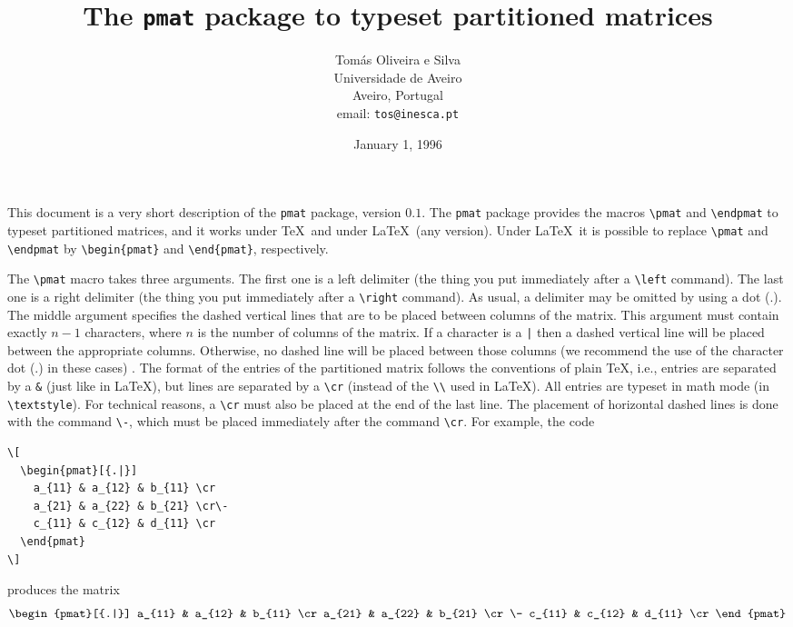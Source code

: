 \documentclass[a4paper]{article}
\begin{document}
\title{The \texttt{pmat} package to typeset partitioned matrices}
\author{Tom\'as Oliveira e Silva \\[4pt] Universidade de Aveiro \\
  Aveiro, Portugal \\[8pt] email: \texttt{tos@inesca.pt}}
\date{January 1, 1996}
\maketitle

This document is a very short description of the \texttt{pmat} package,
version $0.1$. The \texttt{pmat} package provides the macros \verb+\pmat+
and \verb+\endpmat+ to typeset partitioned matrices, and it works under
\TeX\ and under \LaTeX\ (any version). Under \LaTeX\ it is possible to replace
\verb+\pmat+ and \verb+\endpmat+ by \verb+\begin{pmat}+ and \verb+\end{pmat}+,
respectively.

The \verb+\pmat+ macro takes three arguments. The first one is a left
delimiter (the thing you put immediately after a \verb+\left+ command). 
The last one is a right delimiter (the thing you put immediately after a
\verb+\right+ command). As usual, a delimiter may be omitted by using a dot
(.). The middle argument specifies the dashed vertical lines that are to be
placed between columns of the matrix. This argument must contain exactly $n-1$
characters, where $n$ is the number of columns of the matrix. If a character
is a \verb+|+ then a dashed vertical line will be placed between the
appropriate columns. Otherwise, no dashed line will be placed between those
columns (we recommend the use of the character dot (.) in these cases) . The
format of the entries of the partitioned matrix follows the conventions of
plain \TeX, i.e., entries are separated by a \verb+&+ (just like in \LaTeX),
but lines are separated by a \verb+\cr+ (instead of the \verb+\\+ used in
\LaTeX). All entries are typeset in math mode (in \verb+\textstyle+). For
technical reasons, a \verb+\cr+ must also be placed at the end of the last
line. The placement of horizontal dashed lines is done with the command
\verb+\-+, which must be placed immediately after the command \verb+\cr+. For
example, the code
\begin{verbatim}
\[
  \begin{pmat}[{.|}]
    a_{11} & a_{12} & b_{11} \cr
    a_{21} & a_{22} & b_{21} \cr\-
    c_{11} & c_{12} & d_{11} \cr
  \end{pmat}
\]
\end{verbatim}
produces the matrix
\[
  \begin{pmat}[{.|}]
    a_{11} & a_{12} & b_{11} \cr
    a_{21} & a_{22} & b_{21} \cr\-
    c_{11} & c_{12} & d_{11} \cr
  \end{pmat}
\]
\end{document}
